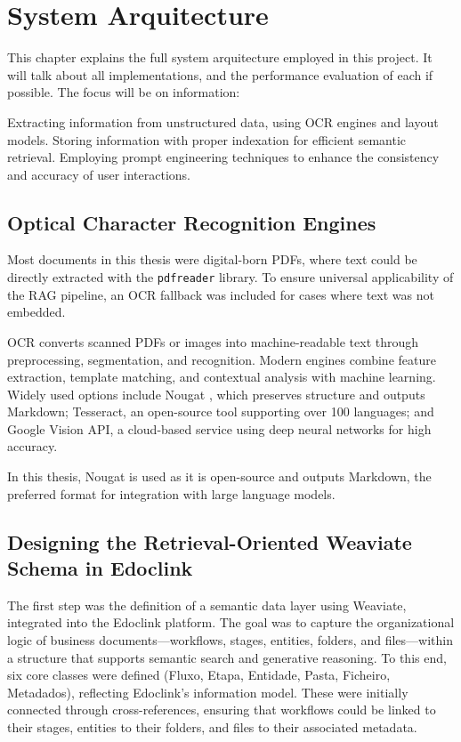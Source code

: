 \chapter{System Arquitecture}
\label{chapter:System_Arquitecture}
This chapter explains the full system arquitecture employed in this project. It will talk about all implementations, and the performance evaluation of each if possible. The focus will be on information:

Extracting information from unstructured data, using OCR engines and layout models.
Storing information with proper indexation for efficient semantic retrieval.
Employing prompt engineering techniques to enhance the consistency and accuracy of user interactions. 

\section{Optical Character Recognition Engines}
\label{sec:ocr}
Most documents in this thesis were digital-born PDFs, where text could be directly extracted with the \texttt{pdfreader} library. To ensure universal applicability of the RAG pipeline, an OCR fallback was included for cases where text was not embedded. 

OCR converts scanned PDFs or images into machine-readable text through preprocessing, segmentation, and recognition. Modern engines combine feature extraction, template matching, and contextual analysis with machine learning. Widely used options include Nougat \cite{blecher2023nougatneuralopticalunderstanding}, which preserves structure and outputs Markdown; Tesseract, an open-source tool supporting over 100 languages; and Google Vision API, a cloud-based service using deep neural networks for high accuracy.

In this thesis, Nougat is used as it is open-source and outputs Markdown, the preferred format for integration with large language models.



\section{Designing the Retrieval-Oriented Weaviate Schema in Edoclink}
\label{sec:schema}

The first step was the definition of a semantic data layer using Weaviate, integrated into the Edoclink platform. The goal was to capture the organizational logic of business documents—workflows, stages, entities, folders, and files—within a structure that supports semantic search and generative reasoning. To this end, six core classes were defined (Fluxo, Etapa, Entidade, Pasta, Ficheiro, Metadados), reflecting Edoclink’s information model. These were initially connected through cross-references, ensuring that workflows could be linked to their stages, entities to their folders, and files to their associated metadata.


